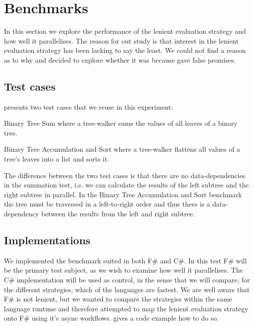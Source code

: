 \section{Benchmarks}
In this section we explore the performance of the lenient evaluation strategy and how well it parallelises. The reason for out study is that interest in the lenient evaluation strategy has been lacking to say the least. We could not find a reason as to why and decided to explore whether it was because \cite{DBLP:journals/cl/Tremblay-parallel} gave false promises.

\subsection{Test cases}
\cite{DBLP:journals/cl/Tremblay-parallel} presents two test cases that we reuse in this experiment:

\begin{labeling}{\quad\quad}
    \item[Binary Tree Sum] where a tree-walker sums the values of all leaves of a binary tree.
    \item[Binary Tree Accumulation and Sort] where a tree-walker flattens all values of a tree's leaves into a list and sorts it.
\end{labeling}

The difference between the two test cases is that there are no data-dependencies in the summation test, i.e. we can calculate the results of the left subtree and the right subtree in parallel. In the Binary Tree Accumulation and Sort benchmark the tree must be traversed in a left-to-right order and thus there is a data-dependency between the results from the left and right subtree.

\subsection{Implementations}
We implemented the benchmark suited in both F\# and C\#. In this test F\# will be the primary test subject, as we wish to examine how well it parallelises. The C\# implementation will be used as control, in the sense that we will compare, for the different strategies, which of the languages are fastest. We are well aware that F\# is not lenient, but we wanted to compare the strategies within the same language runtime and therefore attempted to map the lenient evaluation strategy onto F\# using it's async workflows.  gives a code example how to do so.

